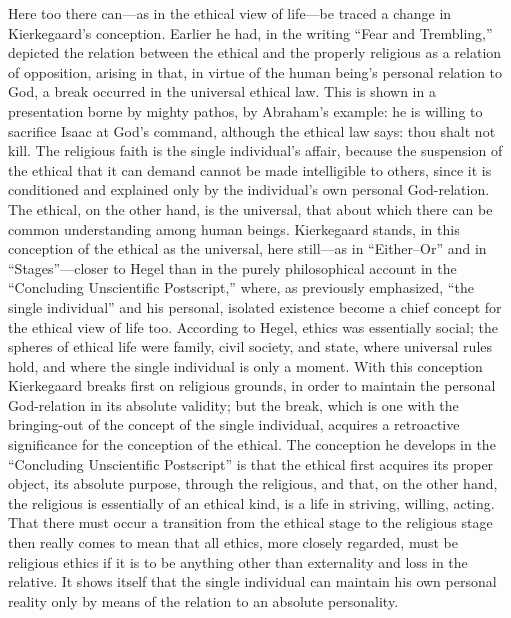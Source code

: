 \documentclass[12pt,a4paper]{book}
\newcommand{\opage}[1]{\marginnote{\footnotesize\textit{[#1]}}}
\begin{document}
\opage{110}Here too there can---as in the ethical view of life---be traced
a change in Kierkegaard's conception. Earlier he had, in the writing
``Fear and Trembling,'' depicted the relation between the ethical and the
properly religious as a relation of opposition, arising in that, in virtue
of the human being's personal relation to God, a break occurred in the
universal ethical law. This is shown in a presentation borne by mighty
pathos, by Abraham's example: he is willing to sacrifice Isaac at God's
command, although the ethical law says: thou shalt not kill. The religious
faith is the single individual's affair, because the suspension of the
ethical that it can demand cannot be made intelligible to others, since it
is conditioned and explained only by the individual's own personal
God-relation. The ethical, on the other hand, is the universal, that about
which there can be common understanding among human beings. Kierkegaard
stands, in this conception of the ethical as the universal, here
still---as in ``Either--Or'' and in ``Stages''---closer to Hegel than in
the purely philosophical account in the ``Concluding Unscientific
Postscript,'' where, as previously emphasized, ``the single individual''
and his personal, isolated existence become a chief concept for the
ethical view of life too. According to Hegel, ethics was essentially
social; the spheres of ethical life were family, civil society, and state,
where universal rules hold, and where the single individual is only a
moment. With this conception Kierkegaard breaks first on religious
grounds, in order to maintain the personal God-relation in its absolute
validity; but the break, which is one with the bringing-out of the concept
of the single individual, acquires a retroactive significance for the
conception of the ethical. The conception he develops in the ``Concluding
Unscientific Postscript'' is that the ethical first acquires its proper
object, its absolute purpose, through the religious, and that, on the
other hand, the religious is essentially of an ethical kind, is a life in
striving,
\opage{111}willing, acting. That there must occur a transition from the
ethical stage to the religious stage then really comes to mean that all
ethics, more closely regarded, must be religious ethics if it is to be
anything other than externality and loss in the relative. It shows itself
that the single individual can maintain his own personal reality only by
means of the relation to an absolute personality.
\end{document}
